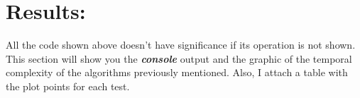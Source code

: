 \section{Results:}

All the code shown above doesn't have significance if its operation is not shown. This section will show you the {\bfseries\itshape console} output and the graphic of the temporal complexity of the algorithms previously mentioned. Also, I attach a table with the plot points for each test.